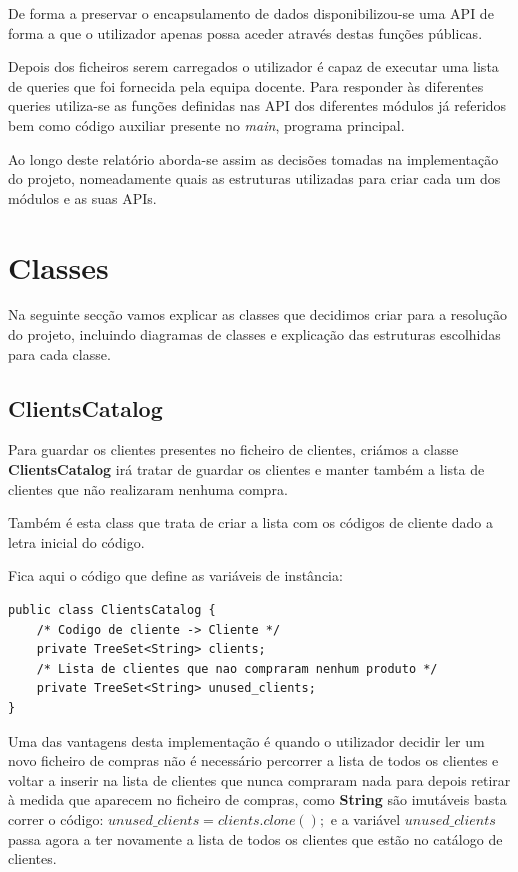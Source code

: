 \documentclass[10pt] {article}
\begin{document}
De forma a preservar o encapsulamento de dados disponibilizou-se uma API de
forma a que o utilizador apenas possa aceder através destas funções públicas.

Depois dos ficheiros serem carregados o utilizador é capaz de executar uma lista de queries que
foi fornecida pela equipa docente.
Para responder às diferentes queries utiliza-se as funções definidas nas API dos diferentes
módulos já referidos bem como código auxiliar presente no \emph{main}, programa principal.

Ao longo deste relatório aborda-se assim as decisões tomadas na implementação do projeto, nomeadamente quais as estruturas utilizadas para criar cada um dos módulos e as suas APIs.


\newpage
\section{Classes}
Na seguinte secção vamos explicar as classes que decidimos criar para a resolução do projeto, incluindo diagramas
de classes e explicação das estruturas escolhidas para cada classe.

\subsection{ClientsCatalog}

Para guardar os clientes presentes no ficheiro de clientes, criámos a classe \textbf{ClientsCatalog} irá tratar de guardar
os clientes e manter também a lista de clientes que não realizaram nenhuma compra.

Também é esta class que trata de criar a lista com os códigos de cliente dado a letra inicial do código.

Fica aqui o código que define as variáveis de instância:

\begin{lstlisting}
public class ClientsCatalog {
	/* Codigo de cliente -> Cliente */
	private TreeSet<String> clients;
	/* Lista de clientes que nao compraram nenhum produto */
	private TreeSet<String> unused_clients;
}
\end{lstlisting}


Uma das vantagens desta implementação é quando o utilizador decidir ler um novo ficheiro de compras não é necessário
percorrer a lista de todos os clientes e voltar a inserir na lista de clientes que nunca compraram nada para depois retirar à
medida que aparecem no ficheiro de compras, como \textbf{String} são imutáveis basta correr o código:
$unused\_clients = clients.clone();$ e a variável $unused\_clients$ passa agora a ter novamente a lista de todos os clientes que estão no catálogo de clientes.
\end{document}
